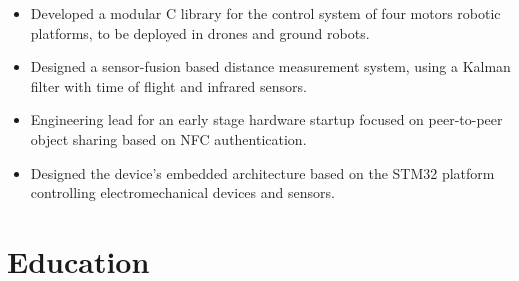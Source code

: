 \documentclass[11pt,letterpaper,sans]{moderncv}       %
\begin{document}
        \vspace{-1pt}
        {
        \vspace{-1pt}
        \begin{itemize}
            \item Developed a modular C library for the control system of four motors robotic platforms, to be deployed in drones and ground robots.
            \item Designed a sensor-fusion based distance measurement system, using a Kalman filter with time of flight and infrared sensors.
        \end{itemize}
        } 
        
        \vspace{-1pt}
        {
        \vspace{-1pt}
        \begin{itemize}
            \item Engineering lead for an early stage hardware startup focused on peer-to-peer object sharing based on NFC authentication.
            \item Designed the device's embedded architecture based on the STM32 platform controlling electromechanical devices and sensors.
        \end{itemize}
        } 
          \vspace{-13pt}
    
    \section{Education}
        
        
        \vspace{-1pt}
        
\end{document}
